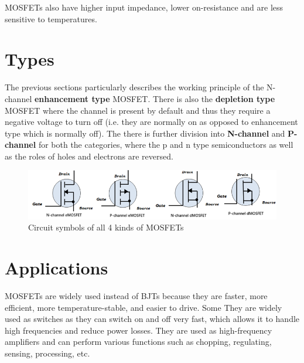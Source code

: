 MOSFETs also have higher input impedance, lower on-resistance and are less sensitive to temperatures.

\section*{Types}
The previous sections particularly describes the working principle of the N-channel \textbf{enhancement type} MOSFET. There is also the \textbf{depletion type} MOSFET where the channel is present by default and thus they require a negative voltage to turn off (i.e. they are normally on as opposed to enhancement type which is normally off). The there is further division into \textbf{N-channel} and \textbf{P-channel} for both the categories, where the p and n type semiconductors as well as the roles of holes and electrons are reversed.

\begin{figure}[H]
    \centering
    \includegraphics[width=1\columnwidth]{images/types1.png}
    \caption{Circuit symbols of all 4 kinds of MOSFETs}
\end{figure}

\section*{Applications}
MOSFETs are widely used instead of BJTs because they are faster, more efficient, more temperature-stable, and easier to drive. Some They are widely used as switches as they can switch on and off very fast, which allows it to handle high frequencies and reduce power losses. They are used as high-frequency amplifiers and can perform various functions such as chopping, regulating, sensing, processing, etc.